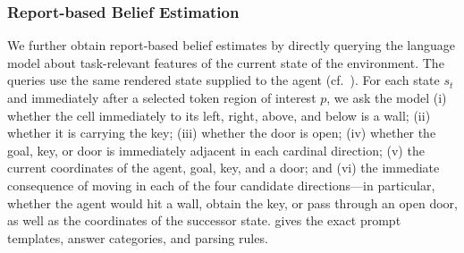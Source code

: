 \documentclass{article}
\begin{document}
\subsubsection{Report-based Belief Estimation}
\label{sec:report-based-estimation}

We further obtain report-based belief estimates by directly querying the language model about task-relevant features of the current state of the environment. 
The queries use the same rendered state supplied to the agent (cf.~). 
For each state $s_t$ and immediately after a selected token region of interest $p$, we ask the model (i) whether the cell immediately to its left, right, above, and below is a wall; (ii) whether it is carrying the key; (iii) whether the door is open; (iv) whether the goal, key, or door is immediately adjacent in each cardinal direction; (v) the current coordinates of the agent, goal, key, and a door; and (vi) the immediate consequence of moving in each of the four candidate directions---in particular, whether the agent would hit a wall, obtain the key, or pass through an open door, as well as the coordinates of the successor state.
 gives the exact prompt templates, answer categories, and parsing rules. %
\end{document}
